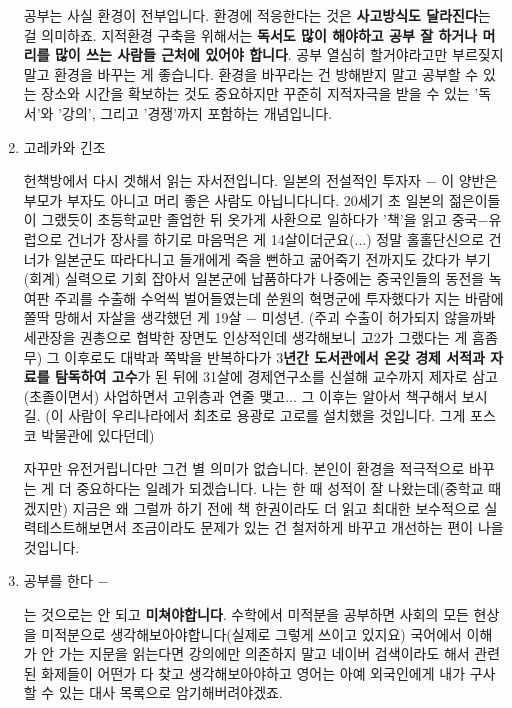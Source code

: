 \begin{enumerate}
    공부는 사실 환경이 전부입니다. 환경에 적응한다는 것은 \textbf{사고방식도 달라진다}는 걸 의미하죠.
    지적환경 구축을 위해서는 \textbf{독서도 많이 해야하고 공부 잘 하거나 머리를 많이 쓰는 사람들 근처에 있어야 합니다}.
    공부 열심히 할거야라고만 부르짖지 말고 환경을 바꾸는 게 좋습니다.
    환경을 바꾸라는 건 방해받지 말고 공부할 수 있는 장소와 시간을 확보하는 것도 중요하지만
    꾸준히 지적자극을 받을 수 있는 '독서'와 '강의', 그리고 '경쟁'까지 포함하는 개념입니다.
    \vspace{5mm}

    \item 고레카와 긴조
    \vspace{5mm}

    헌책방에서 다시 겟해서 읽는 자서전입니다. 일본의 전설적인 투자자 $-$
    이 양반은 부모가 부자도 아니고 머리 좋은 사람도 아닙니다니다.
    20세기 초 일본의 젊은이들이 그랬듯이 초등학교만 졸업한 뒤 옷가게 사환으로 일하다가
    '책'을 읽고 중국$-$유럽으로 건너가 장사를 하기로 마음먹은 게 14살이더군요(...)
    정말 홀홀단신으로 건너가 일본군도 따라다니고 들개에게 죽을 뻔하고 굶어죽기 전까지도 갔다가
    부기(회계) 실력으로 기회 잡아서 일본군에 납품하다가 나중에는 중국인들의 동전을 녹여판 주괴를 수출해
    수억씩 벌어들였는데 쑨원의 혁명군에 투자했다가 지는 바람에 쫄딱 망해서 자살을 생각했던 게 19살 $-$ 미성년.
    (주괴 수출이 허가되지 않을까봐 세관장을 권총으로 협박한 장면도 인상적인데 생각해보니 고2가 그랬다는 게 흠좀무)
    그 이후로도 대박과 쪽박을 반복하다가 3\textbf{년간 도서관에서 온갖 경제 서적과 자료를 탐독하여 고수}가 된 뒤에
    31살에 경제연구소를 신설해 교수까지 제자로 삼고(초졸이면서) 사업하면서 고위층과 연줄 맺고... 그 이후는 알아서 책구해서 보시길.
    (이 사람이 우리나라에서 최초로 용광로 고로를 설치했을 것입니다. 그게 포스코 박물관에 있다던데)
    \vspace{5mm}

    자꾸만 유전거립니다만 그건 별 의미가 없습니다. 본인이 환경을 적극적으로 바꾸는 게 더 중요하다는 일례가 되겠습니다.
    나는 한 때 성적이 잘 나왔는데(중학교 때겠지만) 지금은 왜 그럴까 하기 전에 책 한권이라도 더 읽고
    최대한 보수적으로 실력테스트해보면서 조금이라도 문제가 있는 건 철저하게 바꾸고 개선하는 편이 나을 것입니다.
    \vspace{5mm}

    \item 공부를 한다 $-$
    \vspace{5mm}

    는 것으로는 안 되고 \textbf{미쳐야합니다}.
    수학에서 미적분을 공부하면 사회의 모든 현상을 미적분으로 생각해보아야합니다(실제로 그렇게 쓰이고 있지요)
    국어에서 이해가 안 가는 지문을 읽는다면 강의에만 의존하지 말고 네이버 검색이라도 해서 관련된 화제들이 어떤가 다 찾고 생각해보아야하고
    영어는 아예 외국인에게 내가 구사할 수 있는 대사 목록으로 암기해버려야겠죠.
    \vspace{5mm}


\end{enumerate}
